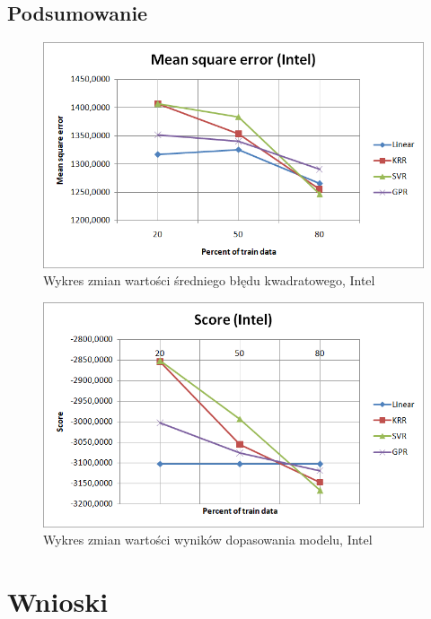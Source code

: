 \subsection{Podsumowanie}

\begin{figure}[h!]
\centering
\includegraphics[width=150mm]{pictures/plots/intel_mean_square.png}
\caption{Wykres zmian wartości średniego błędu kwadratowego, Intel}
\label{fig:Wykres zmian wartości średniego błędu kwadratowego, Intel}
\end{figure}

\begin{figure}[h!]
\centering
\includegraphics[width=150mm]{pictures/plots/intel_score.png}
\caption{Wykres zmian wartości wyników dopasowania modelu, Intel}
\label{fig:Wykres zmian wartości wyników dopasowania modelu, Intel}
\end{figure}

\section{Wnioski}
